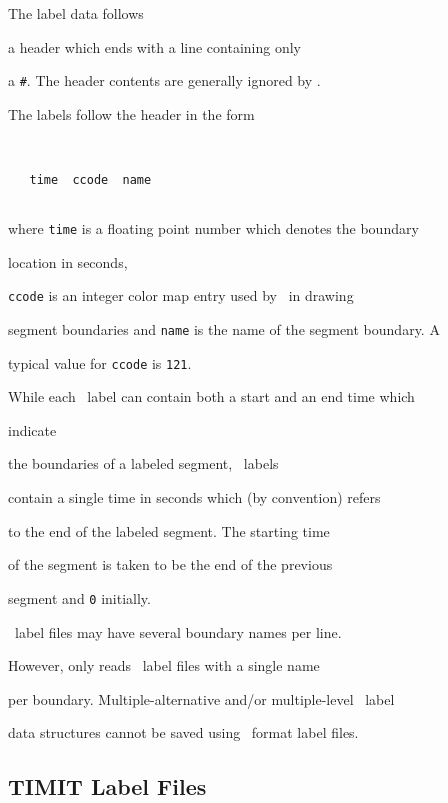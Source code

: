 The label data follows


a header which ends with a line containing only


a \texttt{\#}.  The header contents are generally ignored by .


The labels follow the header in the form


\begin{verbatim}


   time  ccode  name 


\end{verbatim}


where \texttt{time} is a floating point number which denotes the boundary


location  in seconds,


\texttt{ccode} is an integer color map entry used by \ESPSwaves\  in drawing


segment boundaries and \texttt{name} is the name of the segment boundary. A


typical value for \texttt{ccode} is \texttt{121}.





While each \HTK\ label can contain both a start and an end time which


indicate


the boundaries of a labeled segment, \ESPSwaves\ labels


contain a single time in seconds which (by convention) refers 


to the end of the labeled segment.  The starting time


of the segment is taken to be the end of the previous


segment and \texttt{0} initially.





\ESPSwaves\  label files may have several boundary names per line.


However,  only reads \ESPSwaves\ label files with a single name


per boundary.  Multiple-alternative and/or multiple-level \HTK\ label


data structures cannot be saved using  \ESPSwaves\ format label files.





\subsection{TIMIT Label Files}





